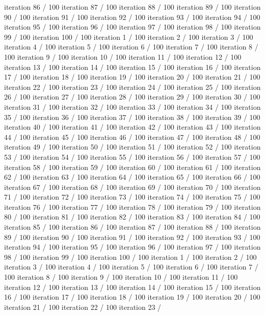 iteration 86 / 100 iteration 87 / 100 iteration 88 / 100 iteration 89 /
100 iteration 90 / 100 iteration 91 / 100 iteration 92 / 100 iteration
93 / 100 iteration 94 / 100 iteration 95 / 100 iteration 96 / 100
iteration 97 / 100 iteration 98 / 100 iteration 99 / 100 iteration 100 /
100 iteration 1 / 100 iteration 2 / 100 iteration 3 / 100 iteration 4 /
100 iteration 5 / 100 iteration 6 / 100 iteration 7 / 100 iteration 8 /
100 iteration 9 / 100 iteration 10 / 100 iteration 11 / 100 iteration 12
/ 100 iteration 13 / 100 iteration 14 / 100 iteration 15 / 100 iteration
16 / 100 iteration 17 / 100 iteration 18 / 100 iteration 19 / 100
iteration 20 / 100 iteration 21 / 100 iteration 22 / 100 iteration 23 /
100 iteration 24 / 100 iteration 25 / 100 iteration 26 / 100 iteration
27 / 100 iteration 28 / 100 iteration 29 / 100 iteration 30 / 100
iteration 31 / 100 iteration 32 / 100 iteration 33 / 100 iteration 34 /
100 iteration 35 / 100 iteration 36 / 100 iteration 37 / 100 iteration
38 / 100 iteration 39 / 100 iteration 40 / 100 iteration 41 / 100
iteration 42 / 100 iteration 43 / 100 iteration 44 / 100 iteration 45 /
100 iteration 46 / 100 iteration 47 / 100 iteration 48 / 100 iteration
49 / 100 iteration 50 / 100 iteration 51 / 100 iteration 52 / 100
iteration 53 / 100 iteration 54 / 100 iteration 55 / 100 iteration 56 /
100 iteration 57 / 100 iteration 58 / 100 iteration 59 / 100 iteration
60 / 100 iteration 61 / 100 iteration 62 / 100 iteration 63 / 100
iteration 64 / 100 iteration 65 / 100 iteration 66 / 100 iteration 67 /
100 iteration 68 / 100 iteration 69 / 100 iteration 70 / 100 iteration
71 / 100 iteration 72 / 100 iteration 73 / 100 iteration 74 / 100
iteration 75 / 100 iteration 76 / 100 iteration 77 / 100 iteration 78 /
100 iteration 79 / 100 iteration 80 / 100 iteration 81 / 100 iteration
82 / 100 iteration 83 / 100 iteration 84 / 100 iteration 85 / 100
iteration 86 / 100 iteration 87 / 100 iteration 88 / 100 iteration 89 /
100 iteration 90 / 100 iteration 91 / 100 iteration 92 / 100 iteration
93 / 100 iteration 94 / 100 iteration 95 / 100 iteration 96 / 100
iteration 97 / 100 iteration 98 / 100 iteration 99 / 100 iteration 100 /
100 iteration 1 / 100 iteration 2 / 100 iteration 3 / 100 iteration 4 /
100 iteration 5 / 100 iteration 6 / 100 iteration 7 / 100 iteration 8 /
100 iteration 9 / 100 iteration 10 / 100 iteration 11 / 100 iteration 12
/ 100 iteration 13 / 100 iteration 14 / 100 iteration 15 / 100 iteration
16 / 100 iteration 17 / 100 iteration 18 / 100 iteration 19 / 100
iteration 20 / 100 iteration 21 / 100 iteration 22 / 100 iteration 23 /
